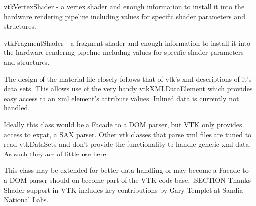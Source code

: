 vtk\-Vertex\-Shader -\/ a vertex shader and enough information to install it into the hardware rendering pipeline including values for specific shader parameters and structures.

vtk\-Fragment\-Shader -\/ a fragment shader and enough information to install it into the hardware rendering pipeline including values for specific shader parameters and structures.

The design of the material file closely follows that of vtk's xml descriptions of it's data sets. This allows use of the very handy vtk\-X\-M\-L\-Data\-Element which provides easy access to an xml element's attribute values. Inlined data is currently not handled.

Ideally this class would be a Facade to a D\-O\-M parser, but V\-T\-K only provides access to expat, a S\-A\-X parser. Other vtk classes that parse xml files are tuned to read vtk\-Data\-Sets and don't provide the functionality to handle generic xml data. As such they are of little use here.

This class may be extended for better data handling or may become a Facade to a D\-O\-M parser should on become part of the V\-T\-K code base. .S\-E\-C\-T\-I\-O\-N Thanks Shader support in V\-T\-K includes key contributions by Gary Templet at Sandia National Labs.

